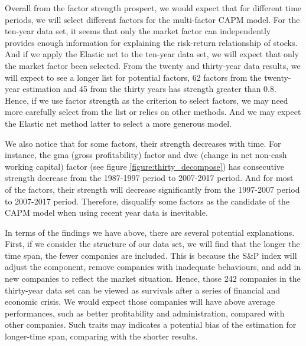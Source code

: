 
Overall from the factor strength prospect, we would expect that for different time periods, we will select different factors for the multi-factor CAPM model.
For the ten-year data set, it seems that only the market factor can independently provides enough information for explaining the risk-return relationship of stocks.
And if we apply the Elastic net to the ten-year data set, we will expect that only the market factor been selected.
From the twenty and thirty-year data results, we will expect to see a longer list for potential factors, 62 factors from the twenty-year estimation and 45 from the thirty years has strength greater than 0.8.
Hence, if we use factor strength as the criterion to select factors, we may need more carefully select from the list or relies on other methods.
And we may expect the Elastic net method latter to select a more generous model.

We also notice that for some factors, their strength decreases with time.
For instance, the gma (gross profitability) factor and dwc (change in net non-cash working capital) factor (see figure \ref{figure:thirty_decompose}) has consecutive strength decrease from the 1987-1997 period to 2007-2017 period.
And for most of the factors, their strength will decrease significantly from the 1997-2007 period to 2007-2017 period.
Therefore, disqualify some factors as the candidate of the CAPM model when using recent year data is inevitable.




In terms of the findings we have above, there are several potential explanations.
First, if we consider the structure of our data set, we will find that the longer the time span, the fewer companies are included.
This is because the S\&P index will adjust the component, remove companies with inadequate behaviours, and add in new companies to reflect the market situation.
Hence, those 242 companies in the thirty-year data set can be viewed as survivals after a series of financial and economic crisis.
We would expect those companies will have above average performances, such as better profitability and administration, compared with other companies. 
Such traits may indicates a potential bias of the estimation for longer-time span, comparing with the shorter results.



